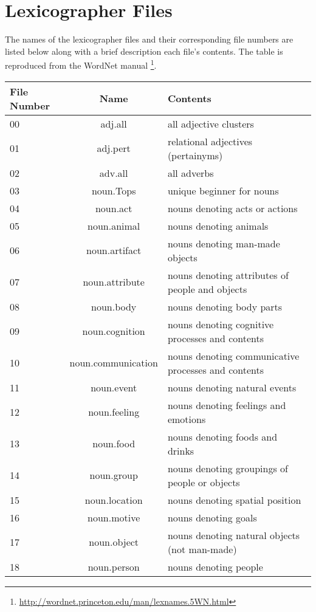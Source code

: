 \chapter{Lexicographer Files}
\label{appendix:lexicographerFiles}
The names of the lexicographer files and their corresponding file numbers are listed below along with a brief description each file's contents. The table is reproduced from the WordNet manual \footnote{\url{http://wordnet.princeton.edu/man/lexnames.5WN.html}}.
\begin{center}
\begin{longtable}{|l|c|p{7cm}|}
\hline
File Number & Name & Contents \\ \hline
00 & adj.all & all adjective clusters \\ \hline
01 & adj.pert & relational adjectives (pertainyms) \\ \hline
02 & adv.all & all adverbs\\ \hline
03 & noun.Tops & unique beginner for nouns\\ \hline
04 & noun.act & nouns denoting acts or actions\\ \hline
05 & noun.animal & nouns denoting animals\\ \hline
06 & noun.artifact & nouns denoting man-made objects\\ \hline
07 & noun.attribute & nouns denoting attributes of people and objects\\ \hline
08 & noun.body & nouns denoting body parts\\ \hline
09 & noun.cognition & nouns denoting cognitive processes and contents\\ \hline
10 & noun.communication & nouns denoting communicative processes and contents\\ \hline
11 & noun.event & nouns denoting natural events\\ \hline
12 & noun.feeling & nouns denoting feelings and emotions\\ \hline
13 & noun.food & nouns denoting foods and drinks\\ \hline
14 & noun.group & nouns denoting groupings of people or objects\\ \hline
15 & noun.location & nouns denoting spatial position\\ \hline
16 & noun.motive & nouns denoting goals\\ \hline
17 & noun.object & nouns denoting natural objects (not man-made)\\ \hline
18 & noun.person & nouns denoting people\\ \hline

\end{longtable}
\end{center}
